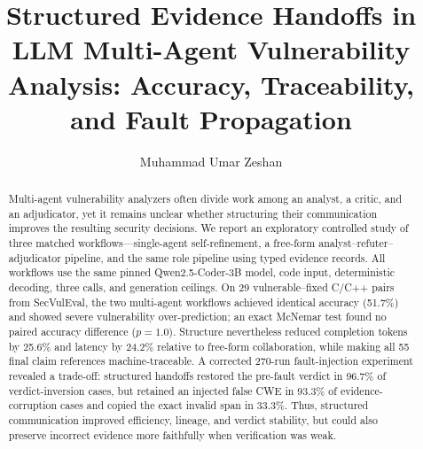 \documentclass[sigconf]{acmart}
\title{Structured Evidence Handoffs in LLM Multi-Agent Vulnerability Analysis: Accuracy, Traceability, and Fault Propagation}
\author{Muhammad Umar Zeshan}
\affiliation{%
  \institution{University of L'Aquila}
  \city{L'Aquila}
  \country{Italy}
}
\begin{document}
\begin{abstract}
Multi-agent vulnerability analyzers often divide work among an analyst, a critic, and an adjudicator, yet it remains unclear whether structuring their communication improves the resulting security decisions. We report an exploratory controlled study of three matched workflows---single-agent self-refinement, a free-form analyst--refuter--adjudicator pipeline, and the same role pipeline using typed evidence records. All workflows use the same pinned Qwen2.5-Coder-3B model, code input, deterministic decoding, three calls, and generation ceilings. On 29 vulnerable--fixed C/C++ pairs from SecVulEval, the two multi-agent workflows achieved identical accuracy (51.7\%) and showed severe vulnerability over-prediction; an exact McNemar test found no paired accuracy difference ($p=1.0$). Structure nevertheless reduced completion tokens by 25.6\% and latency by 24.2\% relative to free-form collaboration, while making all 55 final claim references machine-traceable. A corrected 270-run fault-injection experiment revealed a trade-off: structured handoffs restored the pre-fault verdict in 96.7\% of verdict-inversion cases, but retained an injected false CWE in 93.3\% of evidence-corruption cases and copied the exact invalid span in 33.3\%. Thus, structured communication improved efficiency, lineage, and verdict stability, but could also preserve incorrect evidence more faithfully when verification was weak.
\end{abstract}



\maketitle











\end{document}
